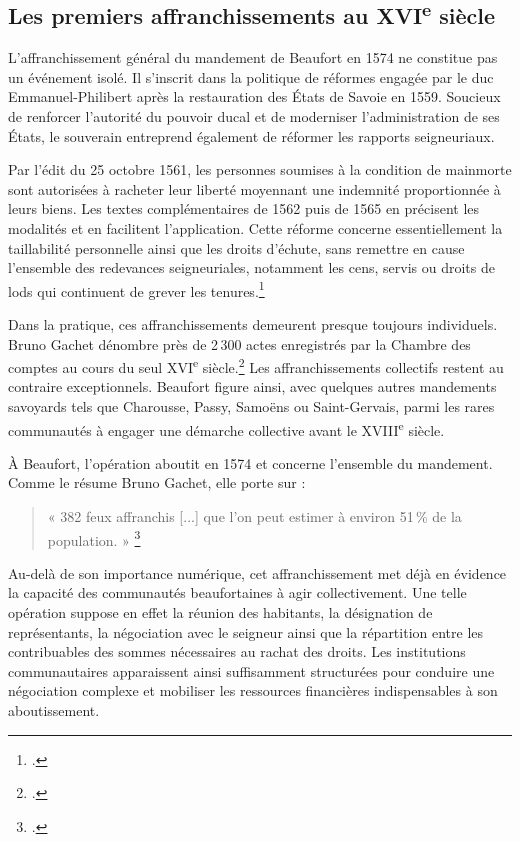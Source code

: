 \documentclass[12pt,a4paper]{report}
\begin{document}
\subsection{Les premiers affranchissements au XVI\textsuperscript{e} siècle}

L'affranchissement général du mandement de Beaufort en 1574 ne constitue pas un événement isolé. Il s'inscrit dans la politique de réformes engagée par le duc Emmanuel-Philibert après la restauration des États de Savoie en 1559. Soucieux de renforcer l'autorité du pouvoir ducal et de moderniser l'administration de ses États, le souverain entreprend également de réformer les rapports seigneuriaux.

Par l'édit du 25 octobre 1561, les personnes soumises à la condition de mainmorte sont autorisées à racheter leur liberté moyennant une indemnité proportionnée à leurs biens. Les textes complémentaires de 1562 puis de 1565 en précisent les modalités et en facilitent l'application. Cette réforme concerne essentiellement la taillabilité personnelle ainsi que les droits d'échute, sans remettre en cause l'ensemble des redevances seigneuriales, notamment les cens, servis ou droits de lods qui continuent de grever les tenures.\footcite{Gachet2022}

Dans la pratique, ces affranchissements demeurent presque toujours individuels. Bruno Gachet dénombre près de 2\,300 actes enregistrés par la Chambre des comptes au cours du seul XVI\textsuperscript{e} siècle.\footcite{Gachet2022} Les affranchissements collectifs restent au contraire exceptionnels. Beaufort figure ainsi, avec quelques autres mandements savoyards tels que Charousse, Passy, Samoëns ou Saint-Gervais, parmi les rares communautés à engager une démarche collective avant le XVIII\textsuperscript{e} siècle.

À Beaufort, l'opération aboutit en 1574 et concerne l'ensemble du mandement. Comme le résume Bruno Gachet, elle porte sur :

\begin{quote}
	« 382 feux affranchis [...] que l'on peut estimer à environ 51\,\% de la population. »
	\footcite[233]{Gachet2022}
\end{quote}

Au-delà de son importance numérique, cet affranchissement met déjà en évidence la capacité des communautés beaufortaines à agir collectivement. Une telle opération suppose en effet la réunion des habitants, la désignation de représentants, la négociation avec le seigneur ainsi que la répartition entre les contribuables des sommes nécessaires au rachat des droits. Les institutions communautaires apparaissent ainsi suffisamment structurées pour conduire une négociation complexe et mobiliser les ressources financières indispensables à son aboutissement.
\end{document}
